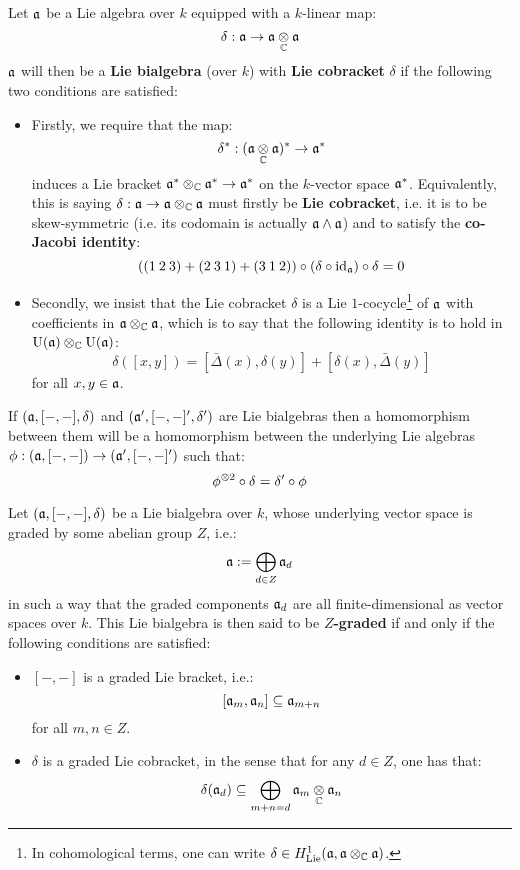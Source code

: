         \begin{definition} \label{def: lie_bialgebras}
            Let $\mathfrak{a}$ be a Lie algebra over $k$ equipped with a $k$-linear map:
                $$\delta: \a \to \a \tensor_{\bbC} \a$$
            $\mathfrak{a}$ will then be a \textbf{Lie bialgebra} (over $k$) with \textbf{Lie cobracket} $\delta$ if the following two conditions are satisfied:
            \begin{itemize}
                \item Firstly, we require that the map:
                    $$\delta^*: (\a \tensor_{\bbC} \a)^* \to \a^*$$
                induces a Lie bracket $\a^* \tensor_{\bbC} \a^* \to \a^*$ on the $k$-vector space $\mathfrak{a}^*$. Equivalently, this is saying $\delta: \a \to \a \tensor_{\bbC} \a$ must firstly be \textbf{Lie cobracket}, i.e. it is to be skew-symmetric (i.e. its codomain is actually $\mathfrak{a} \wedge \mathfrak{a}$) and to satisfy the \textbf{co-Jacobi identity}:
                    $$( (1 \: 2 \: 3) + (2 \: 3 \: 1) + (3 \: 1 \: 2) ) \circ (\delta \circ \mathrm{id}_{\mathfrak{a}}) \circ \delta = 0$$
                \item Secondly, we insist that the Lie cobracket $\delta$ is a Lie $1$-cocycle\footnote{In cohomological terms, one can write $\delta \in H^1_{\Lie}(\a, \a \tensor_{\bbC} \a)$.} of $\mathfrak{a}$ with coefficients in $\a \tensor_{\bbC} \a$, which is to say that the following identity is to hold in $\rmU(\a) \tensor_{\bbC} \rmU(\a)$:
                    $$\delta( [x, y] ) = [\bar{\Delta}(x), \delta(y)] + [\delta(x), \bar{\Delta}(y)]$$
                for all $x, y \in \mathfrak{a}$.
            \end{itemize}
            If $(\mathfrak{a}, [-, -], \delta)$ and $(\mathfrak{a}', [-, -]', \delta')$ are Lie bialgebras then a homomorphism between them will be a homomorphism between the underlying Lie algebras $\phi: (\mathfrak{a}, [-, -]) \to (\mathfrak{a}', [-, -]')$ such that:
                $$\phi^{\tensor 2} \circ \delta = \delta' \circ \phi$$
        \end{definition}
        \begin{definition} \label{def: graded_lie_bialgberas}
            Let $(\mathfrak{a}, [-, -], \delta)$ be a Lie bialgebra over $k$, whose underlying vector space is graded by some abelian group $Z$, i.e.:
                $$\mathfrak{a} := \bigoplus_{d \in Z} \mathfrak{a}_d$$
            in such a way that the graded components $\mathfrak{a}_d$ are all finite-dimensional as vector spaces over $k$. This Lie bialgebra is then said to be \textbf{$Z$-graded} if and only if the following conditions are satisfied:
            \begin{itemize}
                \item $[-, -]$ is a graded Lie bracket, i.e.:
                    $$[\mathfrak{a}_m, \mathfrak{a}_n] \subseteq \mathfrak{a}_{m + n}$$
                for all $m, n \in Z$.
                \item $\delta$ is a graded Lie cobracket, in the sense that for any $d \in Z$, one has that:
                    $$\delta(\a_d) \subseteq \bigoplus_{m + n = d} \a_m \tensor_{\bbC} \a_n$$
            \end{itemize}
        \end{definition}
